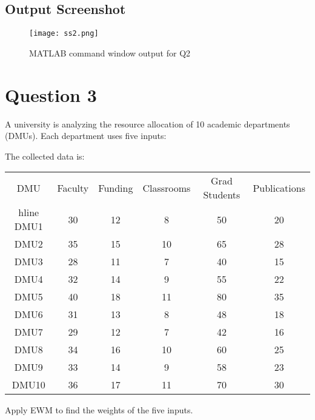 \documentclass[12pt]{article}
\begin{document}
\subsection*{Output Screenshot}
\begin{figure}[h]
  \centering
  \texttt{[image: ss2.png]}
  \caption{MATLAB command window output for Q2}
\end{figure}

\newpage
\section*{Question 3}
A university is analyzing the resource allocation of 10 academic departments (DMUs). Each department uses five inputs:
The collected data is:
\begin{center}
\begin{tabular}{c|ccccc}
DMU & Faculty & Funding & Classrooms & Grad Students & Publications \\hline
DMU1  & 30 & 12 & 8  & 50 & 20 \\
DMU2  & 35 & 15 & 10 & 65 & 28 \\
DMU3  & 28 & 11 & 7  & 40 & 15 \\
DMU4  & 32 & 14 & 9  & 55 & 22 \\
DMU5  & 40 & 18 & 11 & 80 & 35 \\
DMU6  & 31 & 13 & 8  & 48 & 18 \\
DMU7  & 29 & 12 & 7  & 42 & 16 \\
DMU8  & 34 & 16 & 10 & 60 & 25 \\
DMU9  & 33 & 14 & 9  & 58 & 23 \\
DMU10 & 36 & 17 & 11 & 70 & 30 \\
\end{tabular}
\end{center}
Apply EWM to find the weights of the five inputs.
\end{document}
